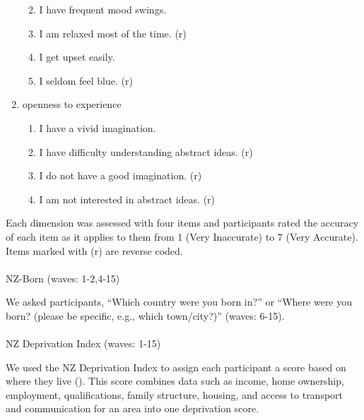 \documentclass[
  single column]{article}
\makeatletter
\let\oldparagraph\paragraph
\renewcommand{\paragraph}{
    \@ifstar
      \xxxParagraphStar
      \xxxParagraphNoStar
  }
\newcommand{\xxxParagraphStar}[1]{\oldparagraph*{#1}\mbox{}}
\newcommand{\xxxParagraphNoStar}[1]{\oldparagraph{#1}\mbox{}}
\providecommand{\tightlist}{%
  \setlength{\itemsep}{0pt}\setlength{\parskip}{0pt}}\usepackage{longtable,booktabs,array}
\makeatother
\begin{document}
\begin{enumerate}
  \begin{enumerate}
  \def\labelenumii{\roman{enumii}.}
  \tightlist
  \item
    I have frequent mood swings.
  \item
    I am relaxed most of the time. (r)
  \item
    I get upset easily.
  \item
    I seldom feel blue. (r)
  \end{enumerate}
\item
  openness to experience

  \begin{enumerate}
  \def\labelenumii{\roman{enumii}.}
  \tightlist
  \item
    I have a vivid imagination.
  \item
    I have difficulty understanding abstract ideas. (r)
  \item
    I do not have a good imagination. (r)
  \item
    I am not interested in abstract ideas. (r)
  \end{enumerate}
\end{enumerate}

Each dimension was assessed with four items and participants rated the
accuracy of each item as it applies to them from 1 (Very Inaccurate) to
7 (Very Accurate). Items marked with (r) are reverse coded.

\paragraph{NZ-Born (waves: 1-2,4-15)}\label{nz-born-waves-1-24-15}

We asked participants, ``Which country were you born in?'' or ``Where
were you born? (please be specific, e.g., which town/city?)'' (waves:
6-15).

\paragraph{NZ Deprivation Index (waves:
1-15)}\label{nz-deprivation-index-waves-1-15}

We used the NZ Deprivation Index to assign each participant a score
based on where they live (). This score combines data such as income, home ownership,
employment, qualifications, family structure, housing, and access to
transport and communication for an area into one deprivation score.
\end{document}
